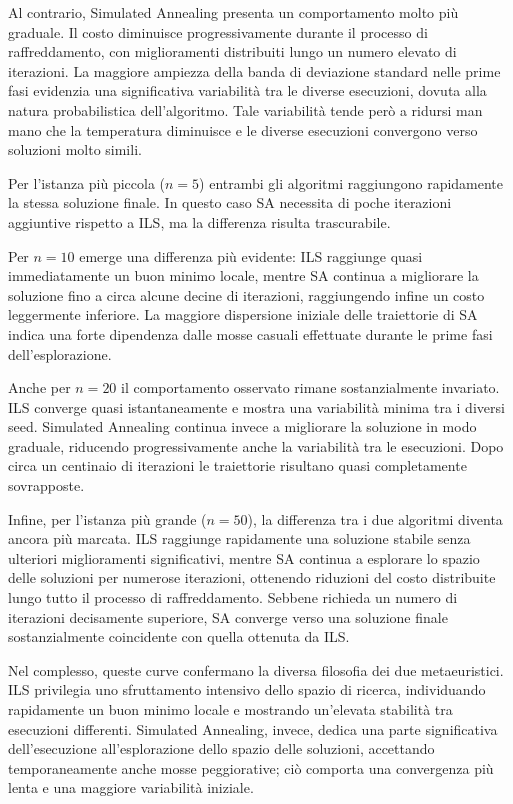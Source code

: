 \documentclass[11pt,a4paper]{article}
\begin{document}
Al contrario, Simulated Annealing presenta un comportamento molto più graduale. Il costo diminuisce progressivamente durante il processo di raffreddamento, con miglioramenti distribuiti lungo un numero elevato di iterazioni. La maggiore ampiezza della banda di deviazione standard nelle prime fasi evidenzia una significativa variabilità tra le diverse esecuzioni, dovuta alla natura probabilistica dell'algoritmo. Tale variabilità tende però a ridursi man mano che la temperatura diminuisce e le diverse esecuzioni convergono verso soluzioni molto simili.

Per l'istanza più piccola ($n=5$) entrambi gli algoritmi raggiungono rapidamente la stessa soluzione finale. In questo caso SA necessita di poche iterazioni aggiuntive rispetto a ILS, ma la differenza risulta trascurabile.

Per $n=10$ emerge una differenza più evidente: ILS raggiunge quasi immediatamente un buon minimo locale, mentre SA continua a migliorare la soluzione fino a circa alcune decine di iterazioni, raggiungendo infine un costo leggermente inferiore. La maggiore dispersione iniziale delle traiettorie di SA indica una forte dipendenza dalle mosse casuali effettuate durante le prime fasi dell'esplorazione.

Anche per $n=20$ il comportamento osservato rimane sostanzialmente invariato. ILS converge quasi istantaneamente e mostra una variabilità minima tra i diversi seed. Simulated Annealing continua invece a migliorare la soluzione in modo graduale, riducendo progressivamente anche la variabilità tra le esecuzioni. Dopo circa un centinaio di iterazioni le traiettorie risultano quasi completamente sovrapposte.

Infine, per l'istanza più grande ($n=50$), la differenza tra i due algoritmi diventa ancora più marcata. ILS raggiunge rapidamente una soluzione stabile senza ulteriori miglioramenti significativi, mentre SA continua a esplorare lo spazio delle soluzioni per numerose iterazioni, ottenendo riduzioni del costo distribuite lungo tutto il processo di raffreddamento. Sebbene richieda un numero di iterazioni decisamente superiore, SA converge verso una soluzione finale sostanzialmente coincidente con quella ottenuta da ILS.

Nel complesso, queste curve confermano la diversa filosofia dei due metaeuristici. ILS privilegia uno sfruttamento intensivo dello spazio di ricerca, individuando rapidamente un buon minimo locale e mostrando un'elevata stabilità tra esecuzioni differenti. Simulated Annealing, invece, dedica una parte significativa dell'esecuzione all'esplorazione dello spazio delle soluzioni, accettando temporaneamente anche mosse peggiorative; ciò comporta una convergenza più lenta e una maggiore variabilità iniziale.
\end{document}
